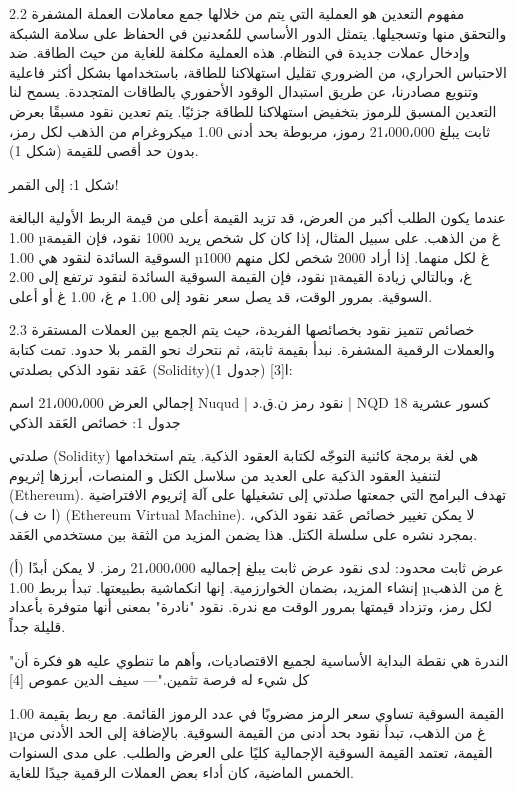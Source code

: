2.2  مفهوم
التعدين هو العملية التي يتم من خلالها جمع معاملات العملة المشفرة والتحقق منها وتسجيلها. يتمثل الدور الأساسي للمُعدنين في الحفاظ على سلامة الشبكة وإدخال عملات جديدة في النظام. هذه العملية مكلفة للغاية من حيث الطاقة. ضد الاحتباس الحراري، من الضروري تقليل استهلاكنا للطاقة، باستخدامها بشكل أكثر فاعلية وتنويع مصادرنا، عن طريق استبدال الوقود الأحفوري بالطاقات المتجددة. يسمح لنا التعدين المسبق للرموز بتخفيض استهلاكنا للطاقة جزئيًا. يتم تعدين نقود مسبقًا بعرض ثابت يبلغ 21،000،000 رموز، مربوطة بحد أدنى 1.00 ميكروغرام من الذهب لكل رمز، بدون حد أقصى للقيمة (شكل 1).




  

شكل 1: إلى القمر!


عندما يكون الطلب أكبر من العرض، قد تزيد القيمة أعلى من قيمة الربط الأولية البالغة 1.00 µغ من الذهب. على سبيل المثال، إذا كان كل شخص يريد 1000 نقود، فإن القيمة السوقية السائدة لنقود هي 1.00 µغ لكل منهما. إذا أراد 2000 شخص لكل منهم 1000 نقود، فإن القيمة السوقية السائدة لنقود ترتفع إلى 2.00 µغ، وبالتالي زيادة القيمة السوقية. بمرور الوقت، قد يصل سعر نقود إلى 1.00 م غ، 1.00 غ أو أعلى.


2.3  خصائص
تتميز نقود بخصائصها الفريدة، حيث يتم الجمع بين العملات المستقرة والعملات الرقمية المشفرة. نبدأ بقيمة ثابتة، ثم نتحرك نحو القمر بلا حدود. تمت كتابة عَقد نقود الذكي بصلدتي (Solidity)ا[3] (جدول 1):


إجمالي العرض
	21،000،000
	اسم
	Nuqud |   نقود
	رمز
	ن.ق.د | NQD
	كسور عشرية
	18
	جدول 1: خصائص العَقد الذكي


صلدتي (Solidity) هي لغة برمجة كائنية التوجّه لكتابة العقود الذكية. يتم استخدامها لتنفيذ العقود الذكية على العديد من سلاسل الكتل و المنصات، أبرزها إثريوم (Ethereum). تهدف البرامج التي جمعتها صلدتي إلى تشغيلها على آلة إثريوم الافتراضية (ا ث ف) (Ethereum Virtual Machine). لا يمكن تغيير خصائص عَقد نقود الذكي، بمجرد نشره على سلسلة الكتل. هذا يضمن المزيد من الثقة بين مستخدمي العَقد.


(أ) عرض ثابت محدود:
لدى نقود عرض ثابت يبلغ إجماليه 21،000،000 رمز. لا يمكن أبدًا إنشاء المزيد، بضمان الخوارزمية. إنها انكماشية بطبيعتها. تبدأ بربط  1.00 µغ من الذهب لكل رمز، وتزداد قيمتها بمرور الوقت مع ندرة. نقود "نادرة" بمعنى أنها متوفرة بأعداد قليلة جداً.


"الندرة هي نقطة البداية الأساسية لجميع الاقتصاديات، وأهم ما تنطوي عليه هو فكرة أن كل شيء له فرصة تثمين."— سيف الدين عموص [4]


القيمة السوقية تساوي سعر الرمز مضروبًا في عدد الرموز القائمة. مع ربط بقيمة 1.00 µغ من الذهب، تبدأ نقود بحد أدنى من القيمة السوقية. بالإضافة إلى الحد الأدنى من القيمة، تعتمد القيمة السوقية الإجمالية كليًا على العرض والطلب. على مدى السنوات الخمس الماضية، كان أداء بعض العملات الرقمية جيدًا للغاية.


